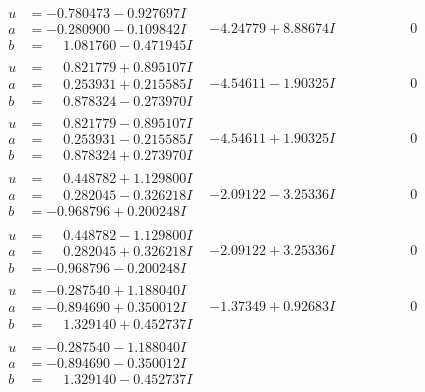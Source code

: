 \documentclass[1p]{elsarticle_modified}
\theoremstyle{definition}
\begin{document}
$$\begin{array}{c|c|c}
\begin{aligned}
u &= -0.780473 - 0.927697 I \\
a &= -0.280900 - 0.109842 I \\
b &= \phantom{-}1.081760 - 0.471945 I\end{aligned}
 & -4.24779 + 8.88674 I & \phantom{-0.000000 } 0 \\ \hline\begin{aligned}
u &= \phantom{-}0.821779 + 0.895107 I \\
a &= \phantom{-}0.253931 + 0.215585 I \\
b &= \phantom{-}0.878324 - 0.273970 I\end{aligned}
 & -4.54611 - 1.90325 I & \phantom{-0.000000 } 0 \\ \hline\begin{aligned}
u &= \phantom{-}0.821779 - 0.895107 I \\
a &= \phantom{-}0.253931 - 0.215585 I \\
b &= \phantom{-}0.878324 + 0.273970 I\end{aligned}
 & -4.54611 + 1.90325 I & \phantom{-0.000000 } 0 \\ \hline\begin{aligned}
u &= \phantom{-}0.448782 + 1.129800 I \\
a &= \phantom{-}0.282045 - 0.326218 I \\
b &= -0.968796 + 0.200248 I\end{aligned}
 & -2.09122 - 3.25336 I & \phantom{-0.000000 } 0 \\ \hline\begin{aligned}
u &= \phantom{-}0.448782 - 1.129800 I \\
a &= \phantom{-}0.282045 + 0.326218 I \\
b &= -0.968796 - 0.200248 I\end{aligned}
 & -2.09122 + 3.25336 I & \phantom{-0.000000 } 0 \\ \hline\begin{aligned}
u &= -0.287540 + 1.188040 I \\
a &= -0.894690 + 0.350012 I \\
b &= \phantom{-}1.329140 + 0.452737 I\end{aligned}
 & -1.37349 + 0.92683 I & \phantom{-0.000000 } 0 \\ \hline\begin{aligned}
u &= -0.287540 - 1.188040 I \\
a &= -0.894690 - 0.350012 I \\
b &= \phantom{-}1.329140 - 0.452737 I\end{aligned}

\end{array}$$
\end{document}
